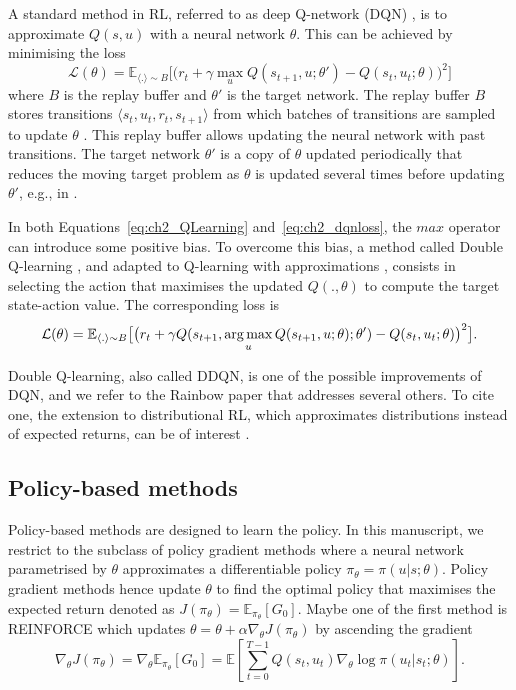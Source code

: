A standard method in RL, referred to as deep Q-network (DQN) \citep{Mnih2015}, is to approximate $Q(s, u)$ with a neural network $\theta$.
This can be achieved by minimising the loss 
\begin{equation}
\label{eq:ch2_dqnloss}
    \mathcal{L}(\theta) = \mathbb{E}_{\langle . \rangle\sim B} \big[\big(r_{t} + \gamma \max_u Q(s_{t+1}, u; \theta')- Q(s_{t}, u_{t}; \theta)\big)^{2}\big]
\end{equation}
where $B$ is the replay buffer and $\theta'$ is the target network.
The replay buffer $B$ stores transitions $\langle s_{t},u_{t},r_{t},s_{t+1}\rangle$ from which batches of transitions are sampled to update $\theta$ \citep{lin1992self}.
This replay buffer allows updating the neural network with past transitions.
The target network $\theta'$ is a copy of $\theta$ updated periodically that reduces the moving target problem as $\theta$ is updated several times before updating $\theta'$, e.g., in \citep{Mnih2015}.

In both Equations~\ref{eq:ch2_QLearning} and~\ref{eq:ch2_dqnloss}, the $max$ operator can introduce some positive bias. 
To overcome this bias, a method called Double Q-learning \citep{hasselt2010double}, and adapted to Q-learning with approximations \citep{van2016deep}, consists in selecting the action that maximises the updated $Q(., \theta)$ to compute the target state-action value.
The corresponding loss is 
\begin{equation}
    \label{eq:ch2_doubleQ}
    \mathcal{L}(\theta) = \mathbb{E}_{\langle . \rangle\sim B} \big[\big(r_{t} + \gamma Q(s_{t+1}, \operatorname*{arg\,max}_u Q(s_{t+1}, u;\theta) ; \theta')- Q(s_{t}, u_{t}; \theta)\big)^{2}\big].
\end{equation}

Double Q-learning, also called DDQN, is one of the possible improvements of DQN, and we refer to the Rainbow paper \citep{hessel2018rainbow} that addresses several others.
To cite one, the extension to distributional RL, which approximates distributions instead of expected returns, can be of interest \citep{bellemare2017distributional, THEATE2023199}. 

\subsection{Policy-based methods} \label{sec:ch2_policy_based_methods}
Policy-based methods are designed to learn the policy.
In this manuscript, we restrict to the subclass of policy gradient methods where a neural network parametrised by $\theta$ approximates a differentiable policy $\pi_\theta=\pi(u|s;\theta)$.
Policy gradient methods hence update $\theta$ to find the optimal policy that maximises the expected return denoted as  $J(\pi_\theta) = \mathbb{E}_{\pi_\theta}[G_0]$.
Maybe one of the first method is REINFORCE \citep{williams1992simple} which updates $\theta = \theta + \alpha \nabla_\theta J(\pi_\theta)$ by ascending the gradient
\begin{equation}
\label{eq:ch2_reinforce_grad}
    \nabla_\theta J(\pi_\theta) = \nabla_\theta \mathbb{E}_{\pi_\theta}[G_0] = \mathbb{E}\left[\sum_{t=0}^{T-1} Q(s_t, u_t) \nabla_\theta \log \pi(u_t|s_t;\theta)\right].
\end{equation}

